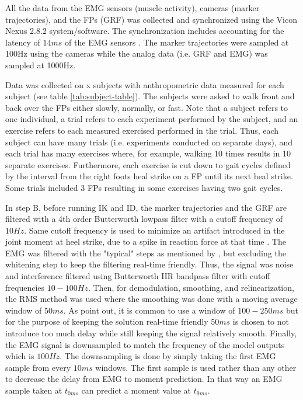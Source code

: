 \documentclass[../main.tex]{subfiles}
\begin{document}
All the data from the \ac{EMG} sensors (muscle activity), cameras (marker trajectories), and the \acp{FP} (\ac{GRF}) was collected and synchronized using the Vicon Nexus 2.8.2 system/software.
The synchronization includes accounting for the latency of $14ms$ of the \ac{EMG} sensors \cite{aktosEMG}.
The marker trajectories were sampled at 100Hz using the cameras while the analog data (i.e. \ac{GRF} and \ac{EMG}) was sampled at 1000Hz.

Data was collected on x subjects with anthropometric data measured for each subject (see table \ref{tab:subject-table}).
The subjects were asked to walk front and back over the \acp{FP} either slowly, normally, or fast.
Note that a subject refers to one individual, a trial refers to each experiment performed by the subject, and an exercise refers to each measured exercised performed in the trial. 
Thus, each subject can have many trials (i.e. experiments conducted on separate days), and each trial has many exercises where, for example, walking 10 times results in 10 separate exercises.
Furthermore, each exercise is cut down to gait cycles defined by the interval from the right foots heal strike on a \ac{FP} until its next heal strike.
Some trials included 3 \acp{FP} resulting in some exercises having two gait cycles.


In step B, before running \ac{IK} and \ac{ID}, the marker trajectories and the \ac{GRF} are filtered with a 4th order Butterworth lowpass filter with a cutoff frequency of $10Hz$. 
Same cutoff frequency is used to minimize an artifact introduced in the joint moment at heel strike, due to a spike in reaction force at that time \cite{Kristianslund2012}.
The \ac{EMG} was filtered with the "typical" steps as mentioned by \citeauthor{Clancy2016} \parencite[99]{Clancy2016}, but excluding the whitening step to keep the filtering real-time friendly.
Thus, the signal was noise and interference filtered using Butterworth IIR bandpass filter with cutoff frequencies $10-100Hz$. 
Then, for demodulation, smoothing, and relinearization, the RMS method was used where the smoothing was done with a moving average window of $50ms$. 
As \citeauthor{Clancy2016} point out, it is common to use a window of $100-250 ms$ but for the purpose of keeping the solution real-time friendly $50ms$ is chosen to not introduce too much delay while still keeping the signal relatively smooth.
Finally, the \ac{EMG} signal is downsampled to match the frequency of the model outputs which is $100Hz$. The downsampling is done by simply taking the first \ac{EMG} sample from every $10ms$ windows. 
The first sample is used rather than any other to decrease the delay from \ac{EMG} to moment prediction. In that way an \ac{EMG} sample taken at $t_{0ms}$ can predict a moment value at $t_{9ms}$. 
\end{document}
